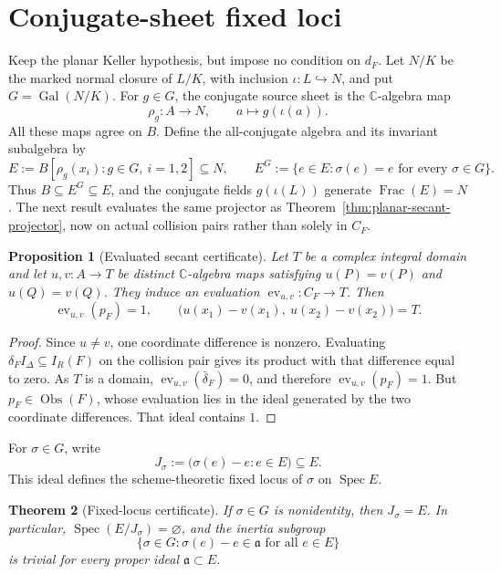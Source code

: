 \documentclass[11pt]{article}
\newtheorem{theorem}{Theorem}[section]
\newtheorem{proposition}[theorem]{Proposition}
\DeclareMathOperator{\Spec}{Spec}\DeclareMathOperator{\Frac}{Frac}
\DeclareMathOperator{\Gal}{Gal}
\newcommand{\C}{\mathbb C}
\newcommand{\Obs}{\operatorname{Obs}}
\begin{document}
\section{Conjugate-sheet fixed loci}
\label{sec:conjugate-cover}

Keep the planar Keller hypothesis, but impose no condition on \(d_F\).
Let \(N/K\) be the marked normal closure of \(L/K\), with inclusion
\(\iota\colon L\hookrightarrow N\), and put \(G=\Gal(N/K)\).  For
\(g\in G\), the conjugate source sheet is the \(\C\)-algebra map
\[
  \rho_g\colon A\longrightarrow N,\qquad a\longmapsto g(\iota(a)).
\]
All these maps agree on \(B\).  Define the all-conjugate algebra and its
invariant subalgebra by
\[
  E:=B[\rho_g(x_i):g\in G,\ i=1,2]\subseteq N,
  \qquad
  E^G:=\{e\in E:\sigma(e)=e\text{ for every }\sigma\in G\}.
\]
Thus \(B\subseteq E^G\subseteq E\), and the conjugate fields
\(g(\iota(L))\) generate \(\Frac(E)=N\).  The next result evaluates the
same projector as Theorem~\ref{thm:planar-secant-projector}, now on actual
collision pairs rather than solely in \(C_F\).

\begin{proposition}[Evaluated secant certificate]
\label{prop:evaluated-projector}
Let \(T\) be a complex integral domain and let
\(u,v\colon A\to T\) be distinct \(\C\)-algebra maps satisfying
\(u(P)=v(P)\) and \(u(Q)=v(Q)\).  They induce an evaluation
\(\operatorname{ev}_{u,v}\colon C_F\to T\).  Then
\[
  \operatorname{ev}_{u,v}(p_F)=1,
  \qquad
  \bigl(u(x_1)-v(x_1),\ u(x_2)-v(x_2)\bigr)=T.
\]
\end{proposition}

\begin{proof}
Since \(u\ne v\), one coordinate difference is nonzero.  Evaluating
\(\delta_FI_\Delta\subseteq I_R(F)\) on the collision pair gives its
product with that difference equal to zero.  As \(T\) is a domain,
\(\operatorname{ev}_{u,v}(\bar\delta_F)=0\), and therefore
\(\operatorname{ev}_{u,v}(p_F)=1\).  But \(p_F\in\Obs(F)\), whose
evaluation lies in the ideal generated by the two coordinate
differences.  That ideal contains \(1\).
\end{proof}

For \(\sigma\in G\), write
\[
  J_\sigma:=\bigl(\sigma(e)-e:e\in E\bigr)\subseteq E.
\]
This ideal defines the scheme-theoretic fixed locus of \(\sigma\) on
\(\Spec E\).

\begin{theorem}[Fixed-locus certificate]
\label{thm:conjugate-fixed-locus}
If \(\sigma\in G\) is nonidentity, then \(J_\sigma=E\).  In particular,
\(\Spec(E/J_\sigma)=\varnothing\), and the inertia subgroup
\[
  \{\sigma\in G:\sigma(e)-e\in\mathfrak a\text{ for all }e\in E\}
\]
is trivial for every proper ideal \(\mathfrak a\subset E\).
\end{theorem}
\end{document}
